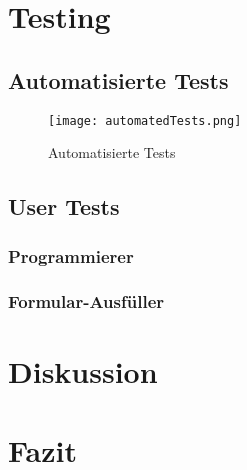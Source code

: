\section{Testing}
\label{sec:testing}


\subsection{Automatisierte Tests}
\label{sec:automatedTests}


\begin{figure}[!htb]
    \centering
    \texttt{[image: automatedTests.png]}
    \caption{Automatisierte Tests}
    \label{img:automatedTests}
\end{figure}


\subsection{User Tests} %
\label{sec:userTests}


\subsubsection{Programmierer}
\label{sec:userTestsProgrammer}


\subsubsection{Formular-Ausfüller}
\label{sec:userTestsEnduser}



\section{Diskussion}
\label{sec:discusion}


\section{Fazit}
\label{sec:summeryNew}

